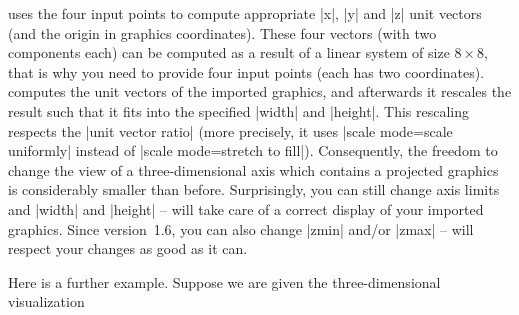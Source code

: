 {{\begin{codeexample}[]
\end{codeexample}
%
\noindent \PGFPlots{} uses the four input points to compute appropriate |x|,
|y| and |z| unit vectors (and the origin in graphics coordinates). These four
vectors (with two components each) can be computed as a result of a linear
system of size $8\times 8$, that is why you need to provide four input points
(each has two coordinates). \PGFPlots{} computes the unit vectors of the
imported graphics, and afterwards it rescales the result such that it fits into
the specified |width| and |height|. This rescaling respects the
|unit vector ratio| (more precisely, it uses |scale mode=scale uniformly|
instead of |scale mode=stretch to fill|). Consequently, the freedom to change
the view of a three-dimensional axis which contains a projected graphics is
considerably smaller than before. Surprisingly, you can still change axis
limits and |width| and |height| -- \PGFPlots{} will take care of a correct
display of your imported graphics. Since version~1.6, you can also change
|zmin| and/or |zmax| -- \PGFPlots{} will respect your changes as good as it
can.

Here is a further example. Suppose we are given the three-dimensional
visualization

{\setlength{\fboxsep}{0pt}%
\centering%
%
}

}}
